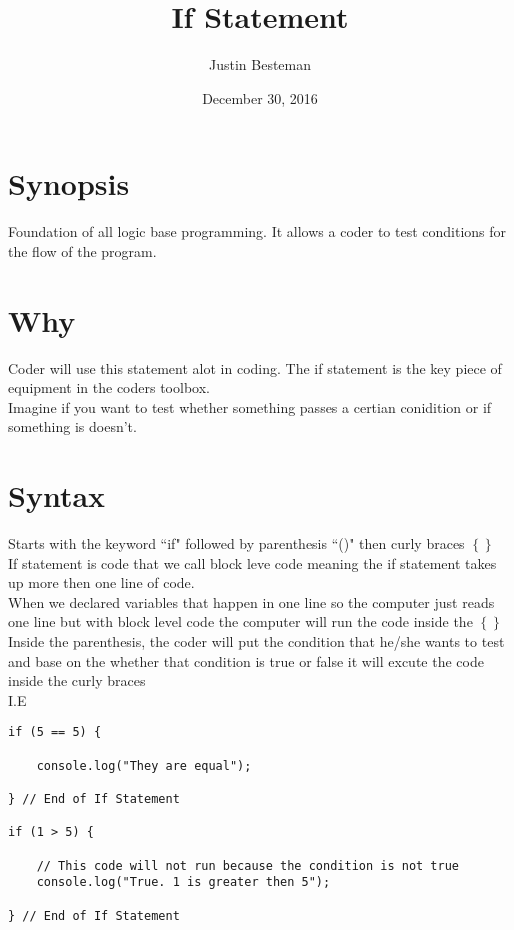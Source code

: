 \documentclass[12pt, letterpaper]{article}
\title{If Statement}
\author{Justin Besteman}
\date{December 30, 2016}
\begin{document}
\maketitle


\section*{Synopsis}

Foundation of all logic base programming. It allows a coder to test conditions for the flow of the program.

\section*{Why}

Coder will use this statement alot in coding. The if statement is the key piece of equipment in the coders toolbox.\\
Imagine if you want to test whether something passes a certian conidition or if something is doesn't.\\

\section*{Syntax}

Starts with the keyword ``if" followed by parenthesis ``()" then curly braces $\left\{\right\}$ \\
If statement is code that we call block leve code meaning the if statement takes up more then one line of code.\\
When we declared variables that happen in one line so the computer just reads one line but with block level code the computer will run the code inside the $\left\{\right\}$ \\
Inside the parenthesis, the coder will put the condition that he/she wants to test and base on the whether that condition is true or false it will excute the code inside the curly braces \\
I.E\\
\begin{lstlisting}
if (5 == 5) {

	console.log("They are equal");

} // End of If Statement

if (1 > 5) {

	// This code will not run because the condition is not true
	console.log("True. 1 is greater then 5");

} // End of If Statement
\end{lstlisting}
\end{document}
